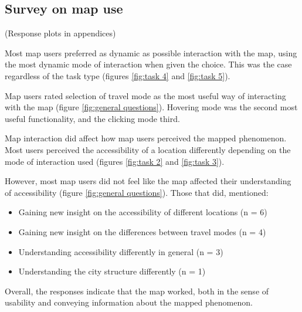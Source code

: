 \subsection{Survey on map use}

(Response plots in appendices)

Most map users preferred as dynamic as possible interaction with the map,
using the most dynamic mode of interaction when given the choice.
This was the case regardless of the task type (figures \ref{fig:task 4} and \ref{fig:task 5}).

Map users rated selection of travel mode as the most useful way of
interacting with the map (figure \ref{fig:general questions}).
Hovering mode was the second most useful functionality,
and the clicking mode third.

Map interaction did affect how map users perceived the mapped phenomenon.
Most users perceived the accessibility of a location differently depending
on the mode of interaction used (figures \ref{fig:task 2} and \ref{fig:task 3}).

However, most map users did not feel like the map affected
their understanding of accessibility (figure \ref{fig:general questions}).
Those that did, mentioned:

\begin{itemize}
	\item Gaining new insight on the accessibility of different locations (n = 6)
	\item Gaining new insight on the differences between travel modes (n = 4)
	\item Understanding accessibility differently in general (n = 3)
	\item Understanding the city structure differently (n = 1)
\end{itemize}

Overall, the responses indicate that the map worked,
both in the sense of usability and conveying information about the mapped phenomenon.

